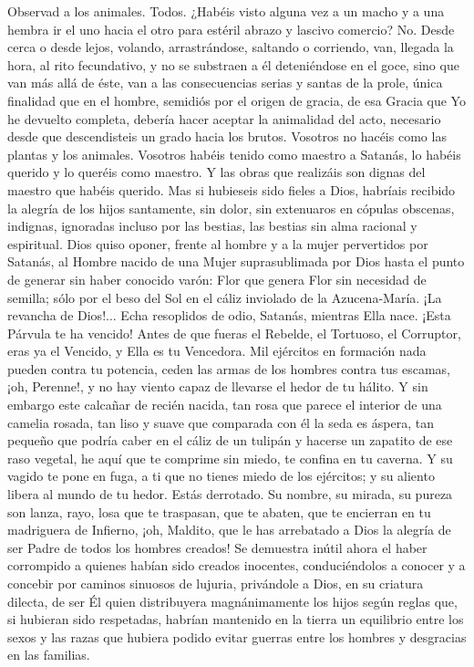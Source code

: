 \documentclass[12pt]{book} %
\begin{document}
Observad a los animales. Todos. ¿Habéis visto alguna vez a un macho y a una hembra ir el uno hacia el otro para estéril 
abrazo y lascivo comercio? No. Desde cerca o desde lejos, volando, arrastrándose, saltando o corriendo, van, llegada la hora, al rito fecundativo, y no se substraen a él deteniéndose en el goce, sino que van más allá de éste, van a las consecuencias serias y santas de la prole, única finalidad que en el hombre, semidiós por el origen de gracia, de esa Gracia que Yo he devuelto completa, debería hacer aceptar la animalidad del acto, necesario desde que descendisteis un grado hacia los brutos. 
Vosotros no hacéis como las plantas y los animales. Vosotros habéis tenido como maestro a Satanás, lo habéis querido 
y lo queréis como maestro. Y las obras que realizáis son dignas del maestro que habéis querido. Mas si hubieseis sido fieles a Dios, habríais recibido la alegría de los hijos santamente, sin dolor, sin extenuaros en cópulas obscenas, indignas, ignoradas incluso por las bestias, las bestias sin alma racional y espiritual. 
Dios quiso oponer, frente al hombre y a la mujer pervertidos por Satanás, al Hombre nacido de una Mujer 
suprasublimada por Dios hasta el punto de generar sin haber conocido varón: Flor que genera Flor sin necesidad de semilla; sólo por el beso del Sol en el cáliz inviolado de la Azucena-María. 
¡La revancha de Dios!... 
Echa resoplidos de odio, Satanás, mientras Ella nace. ¡Esta Párvula te ha vencido! Antes de que fueras el Rebelde, el Tortuoso, el Corruptor, eras ya el Vencido, y Ella es tu Vencedora. Mil ejércitos en formación nada pueden contra tu potencia, ceden las armas de los hombres contra tus escamas, ¡oh, Perenne!, y no hay viento capaz de llevarse el hedor de tu hálito. Y sin embargo este calcañar de recién nacida, tan rosa que parece el interior de una camelia rosada, tan liso y suave que comparada con él la seda es áspera, tan pequeño que podría caber en el cáliz de un tulipán y hacerse un zapatito de ese raso vegetal, he aquí que te comprime sin miedo, te confina en tu caverna. Y su vagido te pone en fuga, a ti que no tienes miedo de los ejércitos; y su aliento libera al mundo de tu hedor. Estás derrotado. Su nombre, su mirada, su pureza son lanza, rayo, losa que te traspasan, que te abaten, que te encierran en tu madriguera de Infierno, ¡oh, Maldito, que le has arrebatado a Dios la alegría de ser Padre de todos los hombres creados! 
Se demuestra inútil ahora el haber corrompido a quienes habían sido creados inocentes, conduciéndolos a conocer y a 
concebir por caminos sinuosos de lujuria, privándole a Dios, en su criatura dilecta, de ser Él quien distribuyera magnánimamente los hijos según reglas que, si hubieran sido respetadas, habrían mantenido en la tierra un equilibrio entre los sexos y las razas que hubiera podido evitar guerras entre los hombres y desgracias en las familias. 
\end{document}
